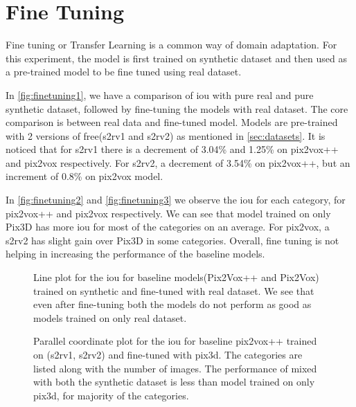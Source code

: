 
\section{Fine Tuning}\label{sec:fine-tuning}
Fine tuning or Transfer Learning is a common way of domain adaptation.
For this experiment, the model is first trained on synthetic dataset and then used as a pre-trained model to be fine tuned using real dataset.

In \autoref{fig:finetuning1}, we have a comparison of \gls{iou}  with pure real and pure synthetic dataset, followed by fine-tuning the models with real dataset.
The core comparison is between real data and fine-tuned model.
Models are pre-trained with 2 versions of \gls{free}(\gls{s2rv1} and \gls{s2rv2}) as mentioned in \autoref{sec:datasets}.
It is noticed that for \gls{s2rv1} there is a decrement of 3.04\% and 1.25\% on pix2vox++ and pix2vox respectively.
For \gls{s2rv2}, a decrement of 3.54\% on pix2vox++, but an increment of 0.8\% on pix2vox model.

In \autoref{fig:finetuning2} and \autoref{fig:finetuning3} we observe the \gls{iou} for each category, for pix2vox++ and pix2vox respectively.
We can see that model trained on only Pix3D has more \gls{iou} for most of the categories on an average.
For pix2vox, a \gls{s2rv2} has slight gain over Pix3D in some categories.
Overall, fine tuning is not helping in increasing the performance of the baseline models.

\begin{figure}
    \centering
    \resizebox{0.75\textwidth}{!}{}
    \caption{Line plot for the \gls{iou} for baseline models(Pix2Vox++ and Pix2Vox) trained on synthetic and fine-tuned with real dataset.
    We see that even after fine-tuning both the models do not perform as good as models trained on only real dataset.}
    \label{fig:finetuning1}
\end{figure}


\begin{figure}
    \centering
    \resizebox{0.75\textwidth}{!}{}
    \caption{Parallel coordinate plot for the \gls{iou} for baseline pix2vox++ trained on (\gls{s2rv1}, \gls{s2rv2}) and fine-tuned with pix3d.
    The categories are listed along with the number of images.
    The performance of  mixed with both the synthetic dataset is less than model trained on only pix3d, for majority of the categories.
    }
    \label{fig:finetuning2}
\end{figure}


